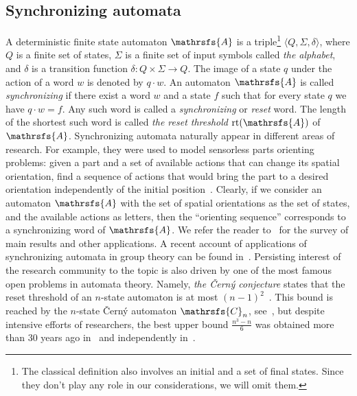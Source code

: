 \documentclass[a4paper,USenglish]{lipics}
\DeclareMathOperator{\rt}{rt}
\theoremstyle{definition}
\begin{document}
\subsection{Synchronizing automata}
A deterministic finite state automaton $\mathrsfs{A}$ is a triple\footnote{The classical definition also involves an initial and a set of final states. Since they don't play any role in our considerations, we will omit them.} $\langle Q, \Sigma, \delta \rangle$, where $Q$ is a finite set of states, $\Sigma$ is a finite set of input symbols called \emph{the alphabet}, and $\delta$ is a transition function $\delta : Q \times \Sigma \rightarrow Q$. The image of a state $q$ under the action of a word $w$ is denoted by $q \cdot w$. An automaton $\mathrsfs{A}$ is called \emph{synchronizing} if there exist a word $w$ and a state $f$ such that for every state $q$ we have $q\cdot w = f$. Any such word is called a \emph{synchronizing} or \emph{reset} word. The length of the shortest such word is called \emph{the reset threshold} $\rt (\mathrsfs{A})$ of $\mathrsfs{A}$. Synchronizing automata naturally appear in different areas of research. For example, they were used to model sensorless parts orienting problems: given a part and a set of available actions that can change its spatial orientation, find a sequence of actions that would bring the part to a desired orientation independently of the initial position~\cite{Na1986}. Clearly, if we consider an automaton $\mathrsfs{A}$ with the set of spatial orientations as the set of states, and the available actions as letters, then the ``orienting sequence'' corresponds to a synchronizing word of $\mathrsfs{A}$. We refer the reader to~\cite{Volkov2008Survey} for the survey of main results and other applications. A recent account of applications of synchronizing automata in group theory can be found in~\cite{ArCaSt15}. Persisting interest of the research community to the topic is also driven by one of the most famous open problems in automata theory. Namely, \emph{the \v{C}ern\'{y} conjecture} states that the reset threshold of an $n$-state automaton is at most $(n-1)^2$~\cite{Cerny1964,CernyPirickaRosenauerova1971}. This bound is reached by the $n$-state \v{C}ern\'{y} automaton $\mathrsfs{C}_n$, see~\cite[p. 18]{Volkov2008Survey}, but despite intensive efforts of researchers, the best upper bound $\tfrac{n^3-n}{6}$ was obtained more than 30 years ago in~\cite{Pin1983OnTwoCombinatorialProblems, Fr1982} and independently in~\cite{KRS1987}.
\end{document}
